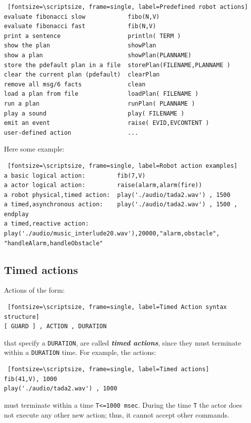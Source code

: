 \begin{Verbatim} [fontsize=\scriptsize, frame=single, label=Predefined robot actions]
evaluate fibonacci slow            fibo(N,V)
evaluate fibonacci fast            fib(N,V)
print a sentence                   println( TERM )
show the plan                      showPlan  
show a plan                        showPlan(PLANNAME)
store the pdefault plan in a file  storePlan(FILENAME,PLANNAME )
clear the current plan (pdefault)  clearPlan
remove all msg/6 facts             clean
load a plan from file              loadPlan( FILENAME )
run a plan                         runPlan( PLANNAME )
play a sound           			   play( FILENAME ) 
emit an event                      raise( EVID,EVCONTENT )  
user-defined action                ...
\end{Verbatim}

Here some example:

\begin{Verbatim} [fontsize=\scriptsize, frame=single, label=Robot action examples]
a basic logical action:         fib(7,V)				
a actor logical action:         raise(alarm,alarm(fire))		
a robot physical,timed action:  play('./audio/tada2.wav') , 1500	
a timed,asynchronous action:    play('./audio/tada2.wav') , 1500 , endplay
a timed,reactive action:        play('./audio/music_interlude20.wav'),20000,"alarm,obstacle", "handleAlarm,handleObstacle"
\end{Verbatim}



\subsection{Timed actions}
Actions of the form:
\begin{Verbatim} [fontsize=\scriptsize, frame=single, label=Timed Action syntax structure]
[ GUARD ] , ACTION , DURATION 
\end{Verbatim}
that specify a \texttt{DURATION}, are called \textit{\textbf{timed actions}}, since they must terminate within a \texttt{DURATION} time.
For example, the actions:
\begin{Verbatim} [fontsize=\scriptsize, frame=single, label=Timed actions]
fib(41,V), 1000		
play('./audio/tada2.wav') , 1000  
\end{Verbatim}
must terminate within a time \texttt{T<=1000 msec}.
During the time \texttt{T} the actor does not execute any other new action; thus, it cannot accept other commands.  

